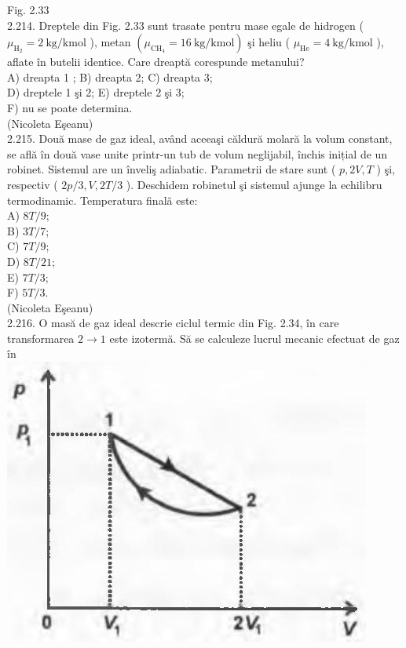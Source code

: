 \documentclass[10pt]{article}
\begin{document}
Fig. 2.33\\
2.214. Dreptele din Fig. 2.33 sunt trasate pentru mase egale de hidrogen ( $\mu_{\mathrm{H}_{2}}=2 \mathrm{~kg} / \mathrm{kmol}$ ), metan $\left(\mu_{\mathrm{CH}_{4}}=16 \mathrm{~kg} / \mathrm{kmol}\right)$ şi heliu ( $\mu_{\mathrm{He}}=4 \mathrm{~kg} / \mathrm{kmol}$ ), aflate în butelii identice. Care dreaptă corespunde metanului?\\
A) dreapta 1 ; B) dreapta 2; C) dreapta 3;\\
D) dreptele 1 şi 2; E) dreptele 2 şi 3;\\
F) nu se poate determina.\\
(Nicoleta Eşeanu)\\
2.215. Două mase de gaz ideal, având aceeaşi căldură molară la volum constant, se află în două vase unite printr-un tub de volum neglijabil, închis inițial de un robinet. Sistemul are un înveliş adiabatic. Parametrii de stare sunt ( $p, 2 V, T$ ) şi, respectiv ( $2 p / 3, V, 2 T / 3$ ). Deschidem robinetul şi sistemul ajunge la echilibru termodinamic. Temperatura finală este:\\
A) $8 T / 9$;\\
B) $3 T / 7$;\\
C) $7 T / 9$;\\
D) $8 T / 21$;\\
E) $7 T / 3$;\\
F) $5 T / 3$.\\
(Nicoleta Eşeanu)\\
2.216. O masă de gaz ideal descrie ciclul termic din Fig. 2.34, în care transformarea $2 \rightarrow 1$ este izotermă. Să se calculeze lucrul mecanic efectuat de gaz în\\
\includegraphics[max width=\textwidth, center]{2025_07_01_5b3ff9fa0d508c8e9f17g-122(1)}
\end{document}
